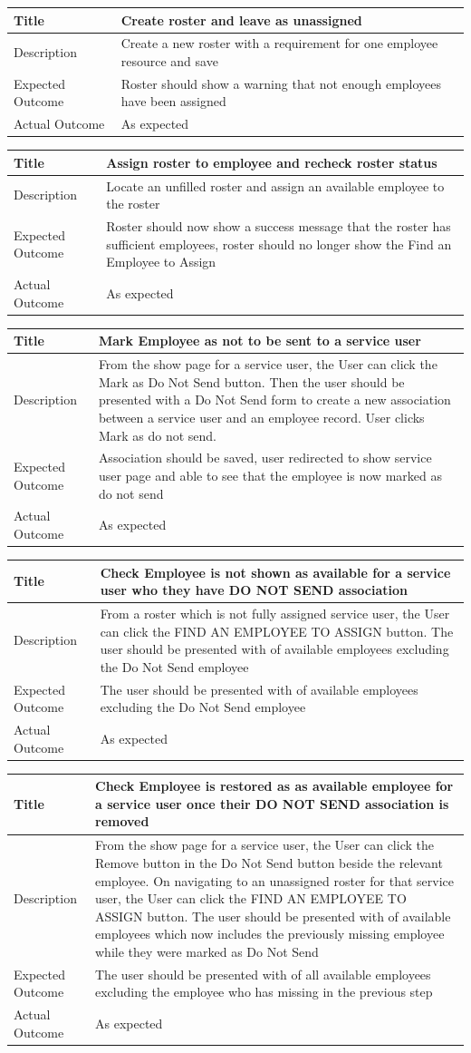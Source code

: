 \documentclass[a4paper,12pt]{article}
\newcommand\addrow[2]{#1 &#2\\ }
\newcommand\addheading[2]{#1 &#2\\ \hline}
\newcommand\tabularhead{\begin{tabular}{lp{11cm}}
\hline
}
\newenvironment{usecase}{\tabularhead}
{\hline\end{tabular}}
\begin{document}
\begin{usecase}
    \addheading{Title}{Create roster and leave as unassigned}
  \addheading{Description}{Create a new roster with a requirement for one employee resource and save}
  \addrow{Expected Outcome}{Roster should show a warning that not enough employees have been assigned}
  \addrow{Actual Outcome}{As expected}
\end{usecase}

\begin{usecase}
    \addheading{Title}{Assign roster to employee and recheck roster status}
  \addheading{Description}{Locate an unfilled roster and assign an available employee to the roster}
  \addrow{Expected Outcome}{Roster should now show a success message that the roster has sufficient employees, roster should no longer show the Find an Employee to Assign}
  \addrow{Actual Outcome}{As expected}
\end{usecase}

\begin{usecase}
    \addheading{Title}{Mark Employee as not to be sent to a service user}
  \addheading{Description}{From the show page for a service user, the User  can click the Mark as Do Not Send button. Then the user should be presented with a Do Not Send form to create a new association between a service user and an employee record. User clicks Mark as do not send.}
  \addrow{Expected Outcome}{ Association should be saved, user redirected to show service user page and able to see that the employee is now marked as do not send }
  \addrow{Actual Outcome}{As expected}
\end{usecase}

\begin{usecase}
    \addheading{Title}{Check Employee is not shown as available for a service user who they have DO NOT SEND association}
  \addheading{Description}{From a roster which is not fully assigned service user, the User  can click the FIND AN EMPLOYEE TO ASSIGN button. The user should be presented with of available employees excluding the Do Not Send employee}
  \addrow{Expected Outcome}{ The user should be presented with of available employees excluding the Do Not Send employee}
  \addrow{Actual Outcome}{As expected}
\end{usecase}

\begin{usecase}
    \addheading{Title}{Check Employee is restored as as available employee for a service user once their DO NOT SEND association is removed}
  \addheading{Description}{From the show page for a service user, the User  can click the Remove button in the Do Not Send button beside the relevant employee. On navigating to an unassigned roster for that service user, the User can click the FIND AN EMPLOYEE TO ASSIGN button. The user should be presented with of available employees which now includes the previously missing employee while they were marked as Do Not Send }
  \addrow{Expected Outcome}{ The user should be presented with of all available employees excluding the employee who has missing in the previous step }
  \addrow{Actual Outcome}{As expected}
\end{usecase}
\end{document}
